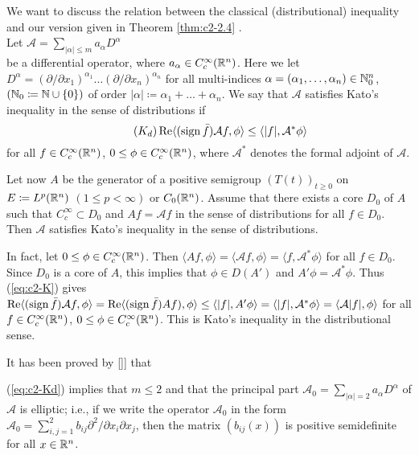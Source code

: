We want to discuss the relation between the classical (distributional) inequality and our version given in Theorem \ref{thm:c2-2.4}  .\\
Let \qquad \qquad $\mathcal{A} = \sum_{|\alpha| \leq m} a_{\alpha} D^{\alpha}$ \\
be a differential operator, where $a_{\alpha} \in C_{c}^{\infty}(\mathbb{R}^n)$.
Here we let \\
$
D^{\alpha} = (\partial/\partial x_1)^{\alpha_1} \ldots (\partial/\partial x_{n})^{\alpha_{n}}
$ 
for all multi-indices $\alpha = (\alpha_1,\ldots,\alpha_{n}) \in \mathbb{N}_{0}^n$, \\
$(\mathbb{N}_{0} \coloneqq \mathbb{N}\cup\{0\})$ of order $|\alpha| \coloneqq \alpha_1 + \ldots + \alpha_{n}$.
We say that $\mathcal{A}$ satisfies Kato's inequality in the sense of distributions if
\begin{equation}\label{eq:c2-Kd} \tag{$K_{d}$}
\Re\langle(\sign \bar{f})\mathcal{A}f, \phi \rangle \leq \langle|f|, \mathcal{A}^{*}\phi \rangle
\end{equation}
for all $f \in C_{c}^{\infty}(\mathbb{R}^n)$, $0 \leq \phi \in C_{c}^{\infty}(\mathbb{R}^n)$, where $\mathcal{A}^{*}$ denotes the formal adjoint of $\mathcal{A}$.

Let now $A$ be the generator of a positive semigroup $(T(t))_{t \geq 0}$ on $E \coloneqq L^p(\mathbb{R}^n)$ $(1 \leq p < \infty)$ or $C_{0}(\mathbb{R}^n)$.
Assume that there exists a core
$D_{0}$ of $A$ such that $C_{c}^{\infty} \subset D_{0}$ and $Af = \mathcal{A}f$ in the sense of distributions for all $f \in D_{0}$.
Then $\mathcal{A}$ satisfies Kato's inequality in the sense of distributions.

In fact, let $0 \leq \phi \in C_{c}^{\infty}(\mathbb{R}^n)$.
Then $\langle Af,\phi \rangle = \langle \mathcal{A}f,\phi \rangle = \langle f,\mathcal{A}^{*}\phi \rangle$ for all $f \in D_{0}$.
Since $D_{0}$ is a core of $A$, this implies that $\phi \in D(A')$ and $A'\phi = \mathcal{A}^{*}\phi$.
Thus (\ref{eq:c2-K})   gives $\mathop{}\!\mathrm{Re}\langle(\operatorname{sign} \bar{f})\mathcal{A}f,\phi \rangle = \mathop{}\!\mathrm{Re}\langle(\operatorname{sign} \bar{f})Af),\phi \rangle \leq \langle |f|,A'\phi \rangle = \langle |f|,\mathcal{A}^{*}\phi \rangle = \langle \mathcal{A}|f|,\phi \rangle$ for all $f \in C_{c}^{\infty}(\mathbb{R}^n)$, $0 \leq \phi \in C_{c}^{\infty}(\mathbb{R}^n)$.
This is Kato's inequality in the distributional sense.

\begin{remark*}\label{rem:c2-3.0}
It has been proved by []\citet{miyajimaandokasawa:1984}] that 

 (\ref{eq:c2-Kd}) implies that $m \leq 2$ and that the principal part $\mathcal{A}_{0} = \sum_{|\alpha|=2} a_{\alpha} D^{\alpha}$ of $\mathcal{A}$ is elliptic; i.e., if we write the operator $\mathcal{A}_{0}$ in the form $\mathcal{A}_{0} = \sum_{i,j=1}^{2} b_{ij} \partial^{2}/\partial x_{i} \partial x_{j}$, then the matrix $(b_{ij}(x))$ is positive semidefinite for all $x \in \mathbb{R}^n$.
\end{remark*}

